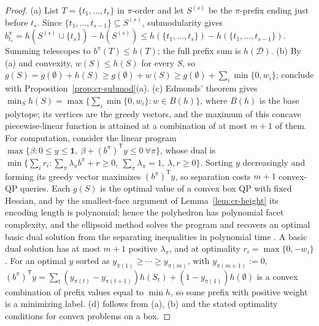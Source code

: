 \begin{proof}
(a) List $T=\{t_1,\ldots,t_r\}$ in $\pi$-order and let $S^{(s)}$ be the
$\pi$-prefix ending just before $t_s$. Since
$\{t_1,\ldots,t_{s-1}\}\subseteq S^{(s)}$, submodularity gives
$b^\pi_{t_s}=h(S^{(s)}\cup\{t_s\})-h(S^{(s)})
\le h(\{t_1,\ldots,t_s\})-h(\{t_1,\ldots,t_{s-1}\})$. Summing telescopes
to $b^\pi(T)\le h(T)$; the full prefix sum is $h(\mathcal D)$.
(b) By (a) and convexity, $w(S)\le h(S)$ for every $S$, so
$g(S)=g(\emptyset)+h(S)\ge g(\emptyset)+w(S)\ge g(\emptyset)+\sum_i\min\{0,w_i\}$;
conclude with Proposition~\ref{prop:cr-submod}(a).
(c) Edmonds' theorem gives
$\min_Sh(S)=\max\{\sum_i\min\{0,w_i\}: w\in B(h)\}$, where $B(h)$ is the
base polytope; its vertices are the greedy vectors, and the maximum of
this concave piecewise-linear function is attained at a combination of at
most $m+1$ of them. For computation, consider the linear program
$\max\{\beta: 0\le y\le\mathbf 1,\ \beta+(b^\pi)^{\mathsf T}y\le0\ \forall\pi\}$,
whose dual is $\min\{\sum_ir_i : \sum_\pi\lambda_\pi b^\pi+r\ge0,\
\sum_\pi\lambda_\pi=1,\ \lambda,r\ge0\}$. Sorting $y$ decreasingly and
forming its greedy vector maximizes $(b^\pi)^{\mathsf T}y$, so separation
costs $m+1$ convex-QP queries. Each $g(S)$ is the optimal value of a convex
box QP with fixed Hessian, and by the smallest-face argument of
Lemma~\ref{lem:cr-height} its encoding length is polynomial; hence the
polyhedron has polynomial facet complexity, and the ellipsoid method
solves the program and recovers an optimal basic dual solution from the
separating inequalities in polynomial time
\cite[Thm.~6.4.9, Lemma~6.5.15]{GrotschelLovaszSchrijver1988}. A basic dual
solution has at most $m+1$ positive $\lambda_\pi$, and at optimality
$r_i=\max\{0,-w_i\}$. For an optimal $y$ sorted as
$y_{\pi(1)}\ge\cdots\ge y_{\pi(m)}$, with $y_{\pi(m+1)}:=0$,
$(b^\pi)^{\mathsf T}y=\sum_t(y_{\pi(t)}-y_{\pi(t+1)})h(S_t)+(1-y_{\pi(1)})h(\emptyset)$
is a convex combination of prefix values equal to $\min h$, so some prefix
with positive weight is a minimizing label. (d) follows from (a), (b) and
the stated optimality conditions for convex problems on a box.
\end{proof}
